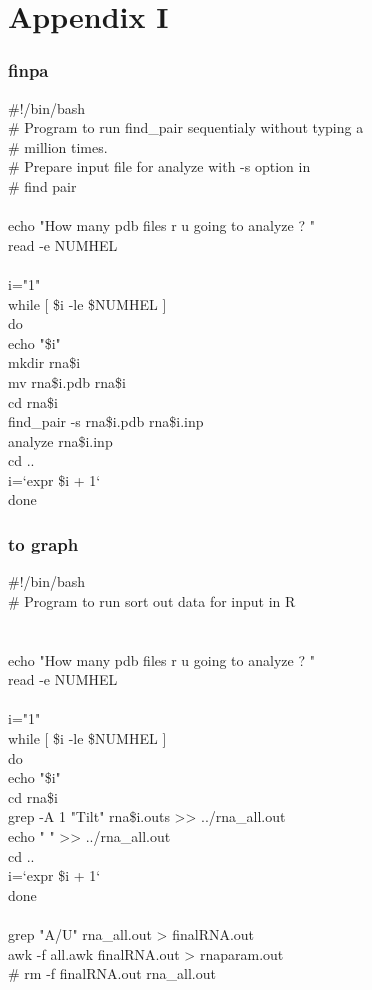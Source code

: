 \part{Appendix I}

\section{finpa}

\#!/bin/bash\\
\# Program to run find\_pair sequentialy without typing a\\
\# million times.\\
\# Prepare input file for analyze with -s option in \\
\# find pair\\
\\
echo "How many pdb files r u going to analyze ? "\\
read -e NUMHEL\\
\\
i="1"\\
while [ \$i -le \$NUMHEL ]\\
do\\
    echo "\$i" \\
    mkdir rna\$i \\
    mv rna\$i.pdb rna\$i \\
    cd rna\$i \\
    find\_pair -s rna\$i.pdb rna\$i.inp \\
    analyze rna\$i.inp \\
    cd .. \\
    i=`expr \$i + 1` \\
done \\

\section{to graph}

\#!/bin/bash\\
\# Program to run sort out data for input in R\\
\\
\\
echo "How many pdb files r u going to analyze ? "\\
read -e NUMHEL\\
\\
i="1"\\
while [ \$i -le \$NUMHEL ]\\
do\\
    echo "\$i"\\
    cd rna\$i\\
    grep -A 1 "Tilt" rna\$i.outs >> ../rna\_all.out\\
    echo " " >> ../rna\_all.out\\
    cd ..\\
    i=`expr \$i + 1`\\
done\\
\\
    grep "A/U" rna\_all.out > finalRNA.out \\
    awk  -f all.awk finalRNA.out > rnaparam.out \\
\#    rm -f finalRNA.out rna\_all.out\\
